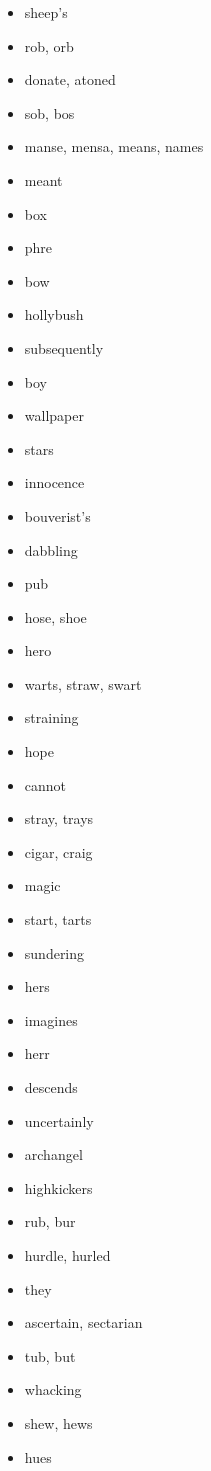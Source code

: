 \documentclass{article}
\begin{document}
\begin{itemize}
    \item sheep's
    \item rob, orb
    \item donate, atoned
    \item sob, bos
    \item manse, mensa, means, names
    \item meant
    \item box
    \item phre
    \item bow
    \item hollybush
    \item subsequently
    \item boy
    \item wallpaper
    \item stars
    \item innocence
    \item bouverist's
    \item dabbling
    \item pub
    \item hose, shoe
    \item hero
    \item warts, straw, swart
    \item straining
    \item hope
    \item cannot
    \item stray, trays
    \item cigar, craig
    \item magic
    \item start, tarts
    \item sundering
    \item hers
    \item imagines
    \item herr
    \item descends
    \item uncertainly
    \item archangel
    \item highkickers
    \item rub, bur
    \item hurdle, hurled
    \item they
    \item ascertain, sectarian
    \item tub, but
    \item whacking
    \item shew, hews
    \item hues

\end{itemize}
\end{document}
